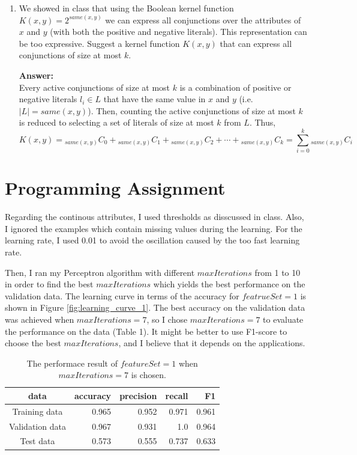 \begin{enumerate}
{\bf Answer:}\\
When both classifiers converge, no more mistakes will be made in the case of the linearly separable dataset. In other words, the training error will be zero for both classifiers.

\item We showed in class that using the Boolean kernel function $K(x, y)=2^{same(x,y)}$ we can express all conjunctions over the attributes of $x$ and $y$ (with both the positive and negative literals). This representation can be too expressive. Suggest a kernel function $K(x, y)$ that can express all conjunctions of size at most $k$.

{\bf Answer:}\\
Every active conjunctions of size at most $k$ is a combination of positive or negative literals $l_i \in L$ that have the same value in $x$ and $y$ (i.e. $|L|=same(x,y)$). Then, counting the active conjunctions of size at most $k$ is reduced to selecting a set of literals of size at most $k$ from $L$. Thus,
\[
K(x, y)={}_{same(x,y)} C _0 + {}_{same(x,y)} C _1 + {}_{same(x,y)} C _2 + \cdots + {}_{same(x,y)} C _k=\sum_{i=0}^{k} {}_{same(x,y)} C _i
\]
\end{enumerate}

\section{Programming Assignment}

Regarding the continous attributes, I used thresholds as disscussed in class. Also, I ignored the examples which contain missing values during the learning. For the learning rate, I used 0.01 to avoid the oscillation caused by the too fast learning rate. 

Then, I ran my Perceptron algorithm with different $maxIterations$ from 1 to 10 in order to find the best $maxIterations$ which yields the best performance on the validation data. The learning curve in terms of the accuracy for $featrueSet = 1$  is shown in Figure \ref{fig:learning_curve_1}.  The best accuracy on the validation data was achieved when $maxIterations=7$, so I chose $maxIterations = 7$ to evaluate the performance on the data (Table 1). It might be better to use F1-score to choose the best $maxIterations$, and I believe that it depends on the applications.

\begin{table}[htb]
\centering
  \begin{tabular}{|c|r|r|r|r|} \hline
    data & accuracy & precision & recall & F1 \\ \hline
    Training data & 0.965 & 0.952 & 0.971 & 0.961 \\ \hline
    Validation data & 0.967 & 0.931 & 1.0 & 0.964 \\ \hline
    Test data & 0.573 & 0.555 & 0.737 & 0.633 \\ \hline
  \end{tabular}
  \caption{The performace result of $featureSet = 1$ when $maxIterations = 7$ is chosen.}
\end{table}

